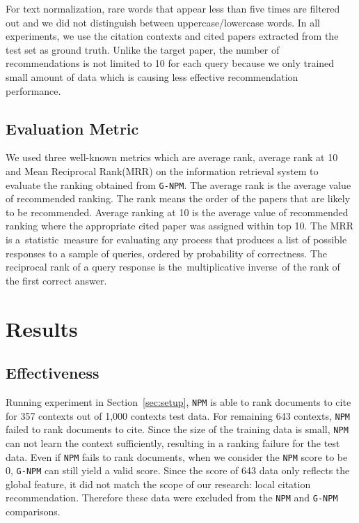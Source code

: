 \documentclass{llncs}
\newcommand{\name}{\texttt{G-NPM}\xspace}
\newcommand{\npm}{\texttt{NPM}\xspace}
\begin{document}
For text normalization, rare words that appear less than five times are filtered out and we did not distinguish between uppercase/lowercase words. In all experiments, we use the citation contexts and cited papers extracted from the test set as ground truth. Unlike the target paper, the number of recommendations is not limited to 10 for each query because we only trained small amount of data which is causing less effective recommendation performance.

\subsection{Evaluation Metric}
\label{sec:metric}
We used three well-known metrics which are average rank, average rank at 10 and Mean Reciprocal Rank(MRR) on the information retrieval system to evaluate the ranking obtained from \name. The average rank is the average value of recommended ranking. The rank means the order of the papers that are likely to be recommended. Average ranking at 10 is the average value of recommended ranking where the appropriate cited paper was assigned within top 10. The MRR is a statistic measure for evaluating any process that produces a list of possible responses to a sample of queries, ordered by probability of correctness. The reciprocal rank of a query response is the multiplicative inverse of the rank of the first correct answer.


\section{Results}

\subsection{Effectiveness}
Running experiment in Section~\ref{sec:setup}, \npm is able to rank documents to cite for 357 contexts out of 1,000 contexts test data. For remaining 643 contexts, \npm failed to rank documents to cite. Since the size of the training data is small, \npm can not learn the context sufficiently, resulting in a ranking failure for the test data. Even if \npm fails to rank documents, when we consider the \npm score to be 0, \name can still yield a valid score. Since the score of 643 data only reflects the global feature, it did not match the scope of our research: local citation recommendation. Therefore these data were excluded from the \npm and \name comparisons.
\end{document}
